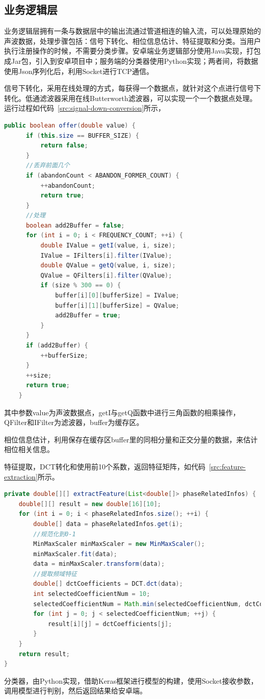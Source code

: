 \subsection{业务逻辑层}
业务逻辑层拥有一条与数据层中的输出流通过管道相连的输入流，可以处理原始的声波数据，处理步骤包括：信号下转化、相位信息估计、特征提取和分类。当用户执行注册操作的时候，不需要分类步骤。安卓端业务逻辑部分使用Java实现，打包成Jar包，引入到安卓项目中；服务端的分类器使用Python实现；两者间，将数据使用Json序列化后，利用Socket进行TCP通信。

信号下转化，采用在线处理的方式，每获得一个数据点，就针对这个点进行信号下转化。低通滤波器采用在线Butterworth滤波器，可以实现一个一个数据点处理。运行过程如代码~\ref{src:signal-down-conversion}所示，
\begin{lstlisting}[language={Java}, caption={实时信号下转化 \label{src:signal-down-conversion}} ]
public boolean offer(double value) {
      if (this.size == BUFFER_SIZE) {
          return false;
      }
      //丢弃前面几个
      if (abandonCount < ABANDON_FORMER_COUNT) {
          ++abandonCount;
          return true;
      }
      //处理
      boolean add2Buffer = false;
      for (int i = 0; i < FREQUENCY_COUNT; ++i) {
          double IValue = getI(value, i, size);
          IValue = IFilters[i].filter(IValue);
          double QValue = getQ(value, i, size);
          QValue = QFilters[i].filter(QValue);
          if (size % 300 == 0) {
              buffer[i][0][bufferSize] = IValue;
              buffer[i][1][bufferSize] = QValue;
              add2Buffer = true;
          }
      }
      if (add2Buffer) {
          ++bufferSize;
      }
      ++size;
      return true;
    }
\end{lstlisting}
其中参数value为声波数据点，getI与getQ函数中进行三角函数的相乘操作，QFilter和IFilter为滤波器，buffer为缓存区。

相位信息估计，利用保存在缓存区buffer里的同相分量和正交分量的数据，来估计相位相关信息。

特征提取，DCT转化和使用前10个系数，返回特征矩阵，如代码~\ref{src:feature-extraction}所示。

\begin{minipage}{\linewidth}
\begin{lstlisting}[language={Java}, caption={特征提取 \label{src:feature-extraction}}]
private double[][] extractFeature(List<double[]> phaseRelatedInfos) {
    double[][] result = new double[16][10];
    for (int i = 0; i < phaseRelatedInfos.size(); ++i) {
        double[] data = phaseRelatedInfos.get(i);
        //规范化到0-1
        MinMaxScaler minMaxScaler = new MinMaxScaler();
        minMaxScaler.fit(data);
        data = minMaxScaler.transform(data);
        //提取频域特征
        double[] dctCoefficients = DCT.dct(data);
        int selectedCoefficientNum = 10;
        selectedCoefficientNum = Math.min(selectedCoefficientNum, dctCoefficients.length);
        for (int j = 0; j < selectedCoefficientNum; ++j) {
            result[i][j] = dctCoefficients[j];
        }
    }
    return result;
}
\end{lstlisting}
\end{minipage}
分类器，由Python实现，借助Keras框架进行模型的构建，使用Socket接收参数，调用模型进行判别，然后返回结果给安卓端。


